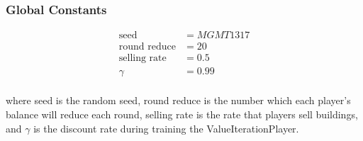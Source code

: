 \documentclass{article}
\begin{document}
    \subsubsection{Global Constants}
    \begin{align*}
        \text{seed} &= MGMT1317 \\
        \text{round reduce} &= 20 \\
        \text{selling rate} &= 0.5 \\
        \gamma &= 0.99 \\
    \end{align*}

    where seed is the random seed, round reduce is the number which each player's balance will reduce each round, selling rate is the rate that players sell buildings, and \( \gamma \) is the discount rate during training the ValueIterationPlayer.
\end{document}

